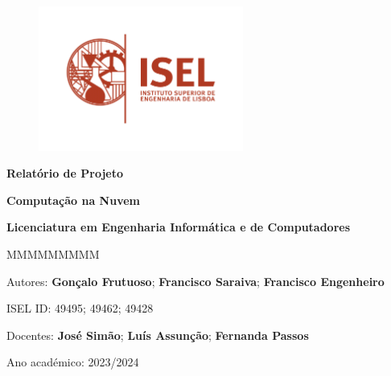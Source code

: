 \begin{figure}
    \centering
    \includegraphics[width=0.6\textwidth]{../figures/logo-isel}
    \label{fig:isel-logo}
\end{figure}

\begin{center}

    \vspace*{2cm} %

    \textbf{\Huge{}Relatório de Projeto}

    \vspace{1cm}

    \textbf{\LARGE{}Computação na Nuvem}

    \textbf{\large{}Licenciatura em Engenharia Informática e de Computadores}{\huge\par}


    \vfill{} %

    \begin{lyxlist}{MMMMMMMMM}
        \begin{singlespace}
            \item [{Autores:}] \textbf{Gonçalo Frutuoso}; \textbf{Francisco Saraiva}; \textbf{Francisco Engenheiro}
            \item [{ISEL ID:}] 49495; 49462; 49428
            \item [{Docentes:}] \textbf{José Simão}; \textbf{Luís Assunção}; \textbf{Fernanda Passos}
            \item [{Ano académico:}] 2023/2024
        \end{singlespace}
    \end{lyxlist}
\end{center}
